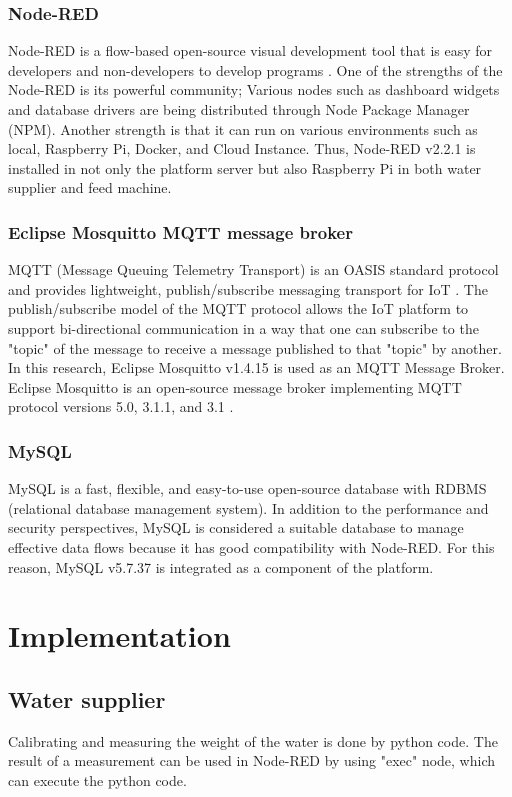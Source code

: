 ﻿\documentclass[conference]{IEEEtran}
\begin{document}
\subsubsection{Node-RED}
Node-RED is a flow-based open-source visual development tool that is easy for developers and non-developers to develop programs \cite{b12}.
One of the strengths of the Node-RED is its powerful community; Various nodes such as dashboard widgets and database drivers are being distributed through Node Package Manager (NPM).
Another strength is that it can run on various environments such as local, Raspberry Pi, Docker, and Cloud Instance.
Thus, Node-RED v2.2.1 is installed in not only the platform server but also Raspberry Pi in both water supplier and feed machine.

\subsubsection{Eclipse Mosquitto MQTT message broker}
MQTT (Message Queuing Telemetry Transport) is an OASIS standard protocol and provides lightweight, publish/subscribe messaging transport for IoT \cite{b8}.
The publish/subscribe model of the MQTT protocol allows the IoT platform to support bi-directional communication in a way that one can subscribe to the "topic" of the message to receive a message published to that "topic" by another.
In this research, Eclipse Mosquitto v1.4.15 is used as an MQTT Message Broker.
Eclipse Mosquitto is an open-source message broker implementing MQTT protocol versions 5.0, 3.1.1, and 3.1 \cite{b13}.

\subsubsection{MySQL}
MySQL is a fast, flexible, and easy-to-use open-source database with RDBMS (relational database management system).
In addition to the performance and security perspectives, MySQL is considered a suitable database to manage effective data flows because it has good compatibility with Node-RED.
For this reason, MySQL v5.7.37 is integrated as a component of the platform.

\section{Implementation}
\subsection{Water supplier}
Calibrating and measuring the weight of the water is done by python code.
The result of a measurement can be used in Node-RED by using "exec" node, which can execute the python code.
\end{document}
